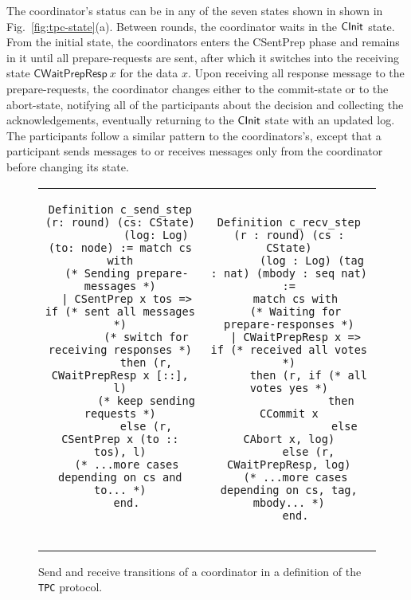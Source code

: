 The coordinator's status can be in any of the seven states shown in
shown in Fig.~\ref{fig:tpc-state}(a).
%
Between rounds, the coordinator waits in the $\mathsf{CInit}$ state.
%
From the initial state, the coordinators enters the \textsf{CSentPrep}
phase and remains in it until all prepare-requests are sent, after
which it switches into the receiving state $\mathsf{CWaitPrepResp}~x$
for the data $x$.
%
Upon receiving all response message to the prepare-requests, the
coordinator changes either to the commit-state or to the abort-state,
notifying all of the participants about the decision and collecting
the acknowledgements, eventually returning to the $\mathsf{CInit}$ state with
an updated log.
%
The participants follow a similar pattern to the coordinators's,
except that a participant sends messages to or receives messages only
from the coordinator before changing its state.

{
\begin{figure}[t!]
\setlength{\belowcaptionskip}{-10pt}
{\centering
\begin{tabular}{c@{\ }c}
\begin{minipage}{0.5\linewidth}
\begin{lstlisting}[basicstyle=\scriptsize\ttfamily]
Definition c_send_step (r: round) (cs: CState)
           (log: Log) (to: node) := match cs with
  (* Sending prepare-messages *)
  | CSentPrep x tos => if (* sent all messages *)
        (* switch for receiving responses *)
        then (r, CWaitPrepResp x [::], l)
        (* keep sending requests *)
        else (r, CSentPrep x (to :: tos), l)
  (* ...more cases depending on cs and to... *)
  end.



\end{lstlisting}
\end{minipage}
&
\begin{minipage}{0.5\linewidth}
\begin{lstlisting}[basicstyle=\scriptsize\ttfamily]
Definition c_recv_step (r : round) (cs : CState)
       (log : Log) (tag : nat) (mbody : seq nat) :=
  match cs with
  (* Waiting for prepare-responses *)
  | CWaitPrepResp x => if (* received all votes *)
      then (r, if (* all votes yes *)
                then CCommit x
	             else CAbort x, log)
      else (r, CWaitPrepResp, log)
  (* ...more cases depending on cs, tag, mbody... *)
  end.
\end{lstlisting}
\vspace{-8pt}
\end{minipage}
\end{tabular}
}
\caption{Send and receive transitions of a coordinator in a \disel
  definition of the {\small\texttt{{TPC}}} protocol.}
\label{fig:coordinator-trans}
\end{figure}
}

